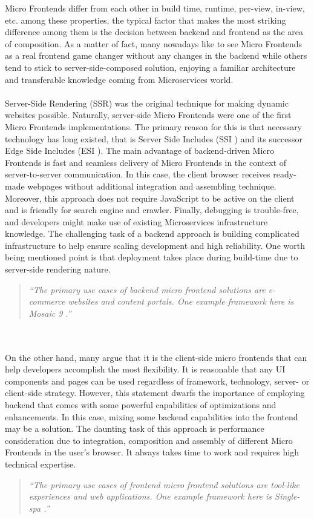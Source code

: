 \documentclass[a4paper]{book}
\begin{document}
Micro Frontends differ from each other in build time, runtime, per-view, in-view, etc. among these properties, the typical factor that makes the most striking difference among them is the decision between backend and frontend as the area of composition. As a matter of fact, many nowadays like to see Micro Frontends as a real frontend game changer without any changes in the backend while others tend to stick to server-side-composed solution, enjoying a familiar architecture and transferable knowledge coming from Microservices world. 
\\ 
\\
Server-Side Rendering (SSR) was the original technique for making dynamic websites possible. Naturally, server-side Micro Frontends were one of the first Micro Frontends implementations. The primary reason for this is that necessary technology has long existed, that is Server Side Includes (SSI \cite{SSI}) and its successor Edge Side Includes (ESI \cite{ESI}). The main advantage of backend-driven Micro Frontends is fast and seamless delivery of Micro Frontends in the context of server-to-server communication. In this case, the client browser receives ready-made webpages without additional integration and assembling technique. Moreover, this approach does not require JavaScript to be active on the client and is friendly for search engine and crawler. Finally, debugging is trouble-free, and developers might make use of existing Microservices infrastructure knowledge. The challenging task of a backend approach is building complicated infrastructure to help ensure scaling development and high reliability. One worth being mentioned point is that deployment takes place during build-time due to server-side rendering nature. \cite{Rap20}
\begin{quote}
    \textit{“The primary use cases of backend micro frontend solutions are e-commerce websites and content portals. One example framework here is Mosaic 9 \cite{Zalando}.”} \cite{Rap20}
\end{quote}
\\ 
\\
On the other hand, many argue that it is the client-side micro frontends that can help developers accomplish the most flexibility. It is reasonable that any UI components and pages can be used regardless of framework, technology, server- or client-side strategy. However, this statement dwarfs the importance of employing backend that comes with some powerful capabilities of optimizations and enhancements. In this case, mixing some backend capabilities into the frontend may be a solution. The daunting task of this approach is performance consideration due to integration, composition and assembly of different Micro Frontends in the user’s browser. It always takes time to work and requires high technical expertise. \cite{Rap20}
\begin{quote}
    \textit{“The primary use cases of frontend micro frontend solutions are tool-like experiences and web applications. One example framework here is Single-spa \cite{SingleSPA}.”} \cite{Rap20}
\end{quote}
\end{document}
